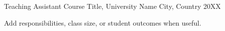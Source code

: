 
\begin{cventries}
  \cventry
    {Teaching Assistant}
    {Course Title, University Name}
    {City, Country}
    {20XX}
    {
      \begin{cvitems}
        \item {Add responsibilities, class size, or student outcomes when useful.}
      \end{cvitems}
    }
\end{cventries}
